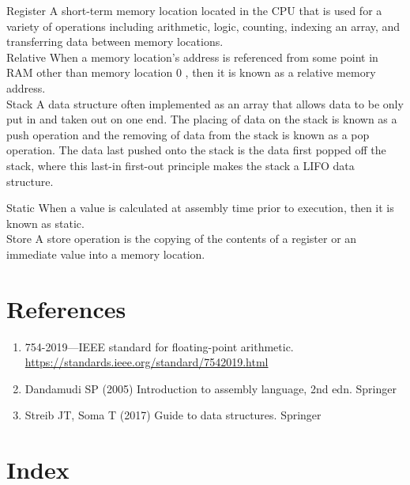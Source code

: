 \documentclass[10pt]{article}
\begin{document}
Register A short-term memory location located in the CPU that is used for a variety of operations including arithmetic, logic, counting, indexing an array, and transferring data between memory locations.\\
Relative When a memory location's address is referenced from some point in RAM other than memory location 0 , then it is known as a relative memory address.\\
Stack A data structure often implemented as an array that allows data to be only put in and taken out on one end. The placing of data on the stack is known as a push operation and the removing of data from the stack is known as a pop operation. The data last pushed onto the stack is the data first popped off the stack, where this last-in first-out principle makes the stack a LIFO data structure.

Static When a value is calculated at assembly time prior to execution, then it is known as static.\\
Store A store operation is the copying of the contents of a register or an immediate value into a memory location.

\section*{References}
\begin{enumerate}
  \item 754-2019—IEEE standard for floating-point arithmetic. \href{https://standards.ieee.org/standard/7542019.html}{https://standards.ieee.org/standard/7542019.html}
  \item Dandamudi SP (2005) Introduction to assembly language, 2nd edn. Springer
  \item Streib JT, Soma T (2017) Guide to data structures. Springer
\end{enumerate}

\section*{Index}
\end{document}

